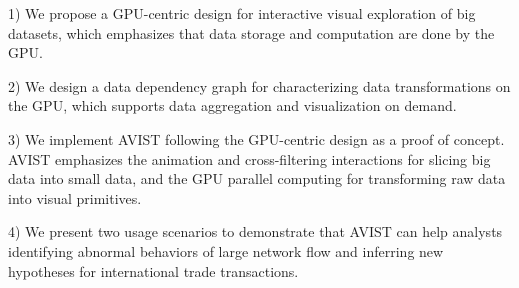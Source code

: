 1) We propose a GPU-centric design for interactive visual exploration of big datasets, which emphasizes that data storage and computation are done by the GPU.

2) We design a data dependency graph for characterizing data transformations on the GPU, which supports data aggregation and visualization on demand.

3) We implement  AVIST following the GPU-centric design as a proof of concept. AVIST emphasizes  the  animation and cross-filtering interactions for slicing big data into small data, and the GPU parallel computing for transforming raw data into visual primitives. 

4) We present two usage scenarios to demonstrate that  AVIST can help analysts identifying abnormal behaviors of large network flow and inferring new hypotheses for international trade transactions.     


